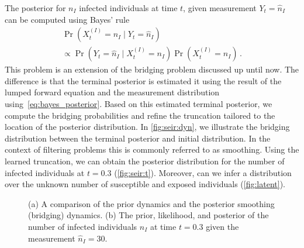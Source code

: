 The posterior for $n_I$ infected individuals at time $t$, given measurement $Y_t=\hat{n}_I$ can be computed using  Bayes' rule
\begin{multline}\label{eq:bayes_posterior}
\Pr(X_t^{(I)}=n_I\mid Y_t=\hat{n}_I)\\ \propto \Pr(Y_t=\hat{n}_I\mid X_t^{(I)} = n_I)\Pr(X_t^{(I)}=n_I)\,.
\end{multline}
This problem is an extension of the bridging problem discussed up until now.
The difference is that the terminal posterior   is   estimated it using the result of the lumped forward equation and the measurement distribution using~\eqref{eq:bayes_posterior}.
Based on this estimated terminal posterior, we compute the bridging probabilities and refine the truncation tailored to the location of the posterior distribution.
In \autoref{fig:seir:dyn}, we illustrate the bridging distribution between the terminal posterior and initial distribution.
In the context of filtering problems this is commonly referred to as smoothing.
Using the learned truncation, we can obtain the posterior distribution for the number of infected individuals at $t=0.3$ (\autoref{fig:seir:t}).
Moreover, can we infer a distribution over the unknown number of susceptible and exposed individuals (\autoref{fig:latent}).
\begin{figure}[t]
    \myfloatalign
	\caption[Bayesian estimation on the \ac{SEIR} model]{
	    (a) A comparison of the prior dynamics and the posterior smoothing (bridging) dynamics.
	    (b) The prior, likelihood, and posterior of the number of infected individuals $n_I$ at time $t=0.3$ given the measurement $\hat{n}_I=30$.}
\end{figure}
